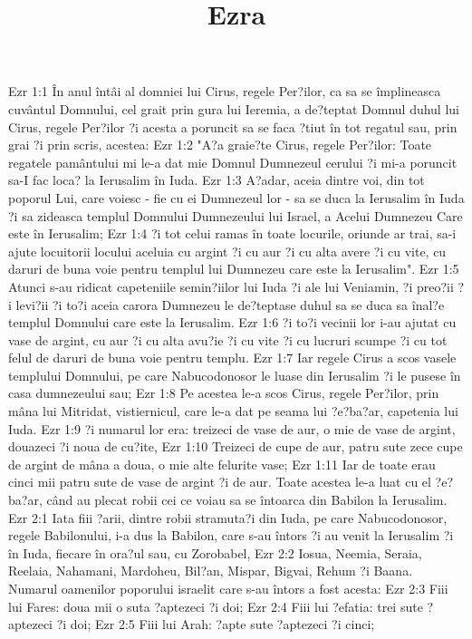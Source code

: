 

\title{Ezra}

Ezr 1:1  În anul întâi al domniei lui Cirus, regele Per?ilor, ca sa se împlineasca cuvântul Domnului, cel grait prin gura lui Ieremia, a de?teptat Domnul duhul lui Cirus, regele Per?ilor ?i acesta a poruncit sa se faca ?tiut în tot regatul sau, prin grai ?i prin scris, acestea:
Ezr 1:2  "A?a graie?te Cirus, regele Per?ilor: Toate regatele pamântului mi le-a dat mie Domnul Dumnezeul cerului ?i mi-a poruncit sa-I fac loca? la Ierusalim în Iuda.
Ezr 1:3  A?adar, aceia dintre voi, din tot poporul Lui, care voiesc - fie cu ei Dumnezeul lor - sa se duca la Ierusalim în Iuda ?i sa zideasca templul Domnului Dumnezeului lui Israel, a Acelui Dumnezeu Care este în Ierusalim;
Ezr 1:4  ?i tot celui ramas în toate locurile, oriunde ar trai, sa-i ajute locuitorii locului aceluia cu argint ?i cu aur ?i cu alta avere ?i cu vite, cu daruri de buna voie pentru templul lui Dumnezeu care este la Ierusalim".
Ezr 1:5  Atunci s-au ridicat capeteniile semin?iilor lui Iuda ?i ale lui Veniamin, ?i preo?ii ?i levi?ii ?i to?i aceia carora Dumnezeu le de?teptase duhul sa se duca sa înal?e templul Domnului care este la Ierusalim.
Ezr 1:6  ?i to?i vecinii lor i-au ajutat cu vase de argint, cu aur ?i cu alta avu?ie ?i cu vite ?i cu lucruri scumpe ?i cu tot felul de daruri de buna voie pentru templu.
Ezr 1:7  Iar regele Cirus a scos vasele templului Domnului, pe care Nabucodonosor le luase din Ierusalim ?i le pusese în casa dumnezeului sau;
Ezr 1:8  Pe acestea le-a scos Cirus, regele Per?ilor, prin mâna lui Mitridat, vistiernicul, care le-a dat pe seama lui ?e?ba?ar, capetenia lui Iuda.
Ezr 1:9  ?i numarul lor era: treizeci de vase de aur, o mie de vase de argint, douazeci ?i noua de cu?ite,
Ezr 1:10  Treizeci de cupe de aur, patru sute zece cupe de argint de mâna a doua, o mie alte felurite vase;
Ezr 1:11  Iar de toate erau cinci mii patru sute de vase de argint ?i de aur. Toate acestea le-a luat cu el ?e?ba?ar, când au plecat robii cei ce voiau sa se întoarca din Babilon la Ierusalim.
Ezr 2:1  Iata fiii ?arii, dintre robii stramuta?i din Iuda, pe care Nabucodonosor, regele Babilonului, i-a dus la Babilon, care s-au întors ?i au venit la Ierusalim ?i în Iuda, fiecare în ora?ul sau, cu Zorobabel,
Ezr 2:2  Iosua, Neemia, Seraia, Reelaia, Nahamani, Mardoheu, Bil?an, Mispar, Bigvai, Rehum ?i Baana. Numarul oamenilor poporului israelit care s-au întors a fost acesta:
Ezr 2:3  Fiii lui Fares: doua mii o suta ?aptezeci ?i doi;
Ezr 2:4  Fiii lui ?efatia: trei sute ?aptezeci ?i doi;
Ezr 2:5  Fiii lui Arah: ?apte sute ?aptezeci ?i cinci;

